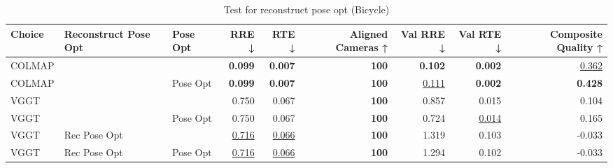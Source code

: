 \begin{table}[H]
\caption{Test for reconstruct pose opt (Bicycle)}
\label{tab:99_reconstruct_pose_opt_bicycle}
\small
\begin{tabular}{lllrrrrrr}
\toprule
Choice & Reconstruct Pose Opt & Pose Opt & RRE ↓ & RTE ↓ & Aligned Cameras ↑ & Val RRE ↓ & Val RTE ↓ & Composite Quality ↑ \\
\midrule
COLMAP &  &  & \textbf{0.099} & \textbf{0.007} & \textbf{100} & \textbf{0.102} & \textbf{0.002} & \underline{0.362} \\
COLMAP &  & Pose Opt & \textbf{0.099} & \textbf{0.007} & \textbf{100} & \underline{0.111} & \textbf{0.002} & \textbf{0.428} \\
VGGT &  &  & 0.750 & 0.067 & \textbf{100} & 0.857 & 0.015 & 0.104 \\
VGGT &  & Pose Opt & 0.750 & 0.067 & \textbf{100} & 0.724 & \underline{0.014} & 0.165 \\
VGGT & Rec Pose Opt &  & \underline{0.716} & \underline{0.066} & \textbf{100} & 1.319 & 0.103 & -0.033 \\
VGGT & Rec Pose Opt & Pose Opt & \underline{0.716} & \underline{0.066} & \textbf{100} & 1.294 & 0.102 & -0.033 \\
\bottomrule
\end{tabular}
\end{table}
